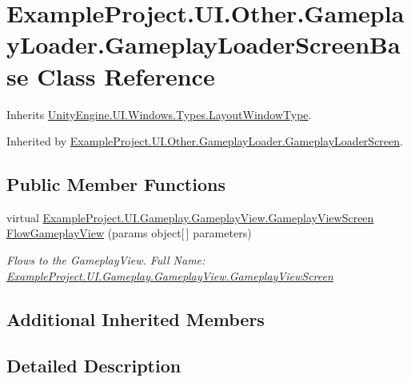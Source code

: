 \hypertarget{class_example_project_1_1_u_i_1_1_other_1_1_gameplay_loader_1_1_gameplay_loader_screen_base}{}\section{Example\+Project.\+U\+I.\+Other.\+Gameplay\+Loader.\+Gameplay\+Loader\+Screen\+Base Class Reference}
\label{class_example_project_1_1_u_i_1_1_other_1_1_gameplay_loader_1_1_gameplay_loader_screen_base}


Inherits \hyperlink{class_unity_engine_1_1_u_i_1_1_windows_1_1_types_1_1_layout_window_type}{Unity\+Engine.\+U\+I.\+Windows.\+Types.\+Layout\+Window\+Type}.



Inherited by \hyperlink{class_example_project_1_1_u_i_1_1_other_1_1_gameplay_loader_1_1_gameplay_loader_screen}{Example\+Project.\+U\+I.\+Other.\+Gameplay\+Loader.\+Gameplay\+Loader\+Screen}.

\subsection*{Public Member Functions}
\begin{DoxyCompactItemize}
\item 
virtual \hyperlink{class_example_project_1_1_u_i_1_1_gameplay_1_1_gameplay_view_1_1_gameplay_view_screen}{Example\+Project.\+U\+I.\+Gameplay.\+Gameplay\+View.\+Gameplay\+View\+Screen} \hyperlink{class_example_project_1_1_u_i_1_1_other_1_1_gameplay_loader_1_1_gameplay_loader_screen_base_a33230b3059cf69627f5321787201beeb}{Flow\+Gameplay\+View} (params object\mbox{[}$\,$\mbox{]} parameters)
\begin{DoxyCompactList}\small\item\em Flows to the Gameplay\+View. Full Name\+: \hyperlink{class_example_project_1_1_u_i_1_1_gameplay_1_1_gameplay_view_1_1_gameplay_view_screen}{Example\+Project.\+U\+I.\+Gameplay.\+Gameplay\+View.\+Gameplay\+View\+Screen} \end{DoxyCompactList}\end{DoxyCompactItemize}
\subsection*{Additional Inherited Members}


\subsection{Detailed Description}



